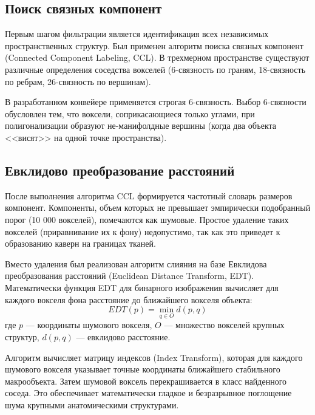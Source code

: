 \documentclass[a4paper,14pt]{article}
\begin{document}
\subsection{Поиск связных компонент}
Первым шагом фильтрации является идентификация всех независимых пространственных структур. Был применен алгоритм поиска связных компонент (Connected Component Labeling, CCL). В трехмерном пространстве существуют различные определения соседства вокселей (6-связность по граням, 18-связность по ребрам, 26-связность по вершинам). 

В разработанном конвейере применяется строгая 6-связность. Выбор 6-связности обусловлен тем, что воксели, соприкасающиеся только углами, при полигонализации образуют не-манифолдные вершины (когда два объекта <<висят>> на одной точке пространства). 

\subsection{Евклидово преобразование расстояний}
После выполнения алгоритма CCL формируется частотный словарь размеров компонент. Компоненты, объем которых не превышает эмпирически подобранный порог (10 000 вокселей), помечаются как шумовые. Простое удаление таких вокселей (приравнивание их к фону) недопустимо, так как это приведет к образованию каверн на границах тканей.

Вместо удаления был реализован алгоритм слияния на базе Евклидова преобразования расстояний (Euclidean Distance Transform, EDT). Математически функция EDT для бинарного изображения вычисляет для каждого вокселя фона расстояние до ближайшего вокселя объекта:
\begin{equation}
    EDT(p) = \min_{q \in O} d(p, q)
\end{equation}
где $p$ — координаты шумового вокселя, $O$ — множество вокселей крупных структур, $d(p, q)$ — евклидово расстояние.

Алгоритм вычисляет матрицу индексов (Index Transform), которая для каждого шумового вокселя указывает точные координаты ближайшего стабильного макрообъекта. Затем шумовой воксель перекрашивается в класс найденного соседа. Это обеспечивает математически гладкое и безразрывное поглощение шума крупными анатомическими структурами.
\end{document}

